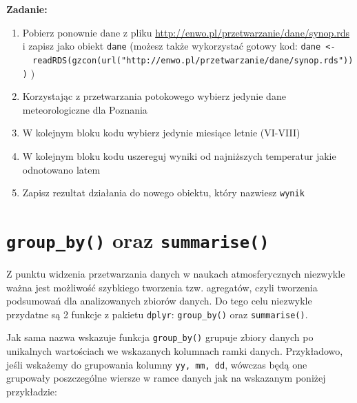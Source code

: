 \documentclass[]{book}
\providecommand{\tightlist}{%
  \setlength{\itemsep}{0pt}\setlength{\parskip}{0pt}}
\theoremstyle{definition}
\theoremstyle{definition}
\theoremstyle{definition}
\theoremstyle{remark}
\begin{document}
\textbf{Zadanie:}

\begin{enumerate}
\def\labelenumi{\arabic{enumi}.}
\tightlist
\item
  Pobierz ponownie dane z pliku
  \url{http://enwo.pl/przetwarzanie/dane/synop.rds} i zapisz jako obiekt
  \texttt{dane} (możesz także wykorzystać gotowy kod:
  \texttt{dane\ \textless{}-\ \ readRDS(gzcon(url("http://enwo.pl/przetwarzanie/dane/synop.rds")))}
  )
\item
  Korzystając z przetwarzania potokowego wybierz jedynie dane
  meteorologiczne dla Poznania
\item
  W kolejnym bloku kodu wybierz jedynie miesiące letnie (VI-VIII)
\item
  W kolejnym bloku kodu uszereguj wyniki od najniższych temperatur jakie
  odnotowano latem
\item
  Zapisz rezultat działania do nowego obiektu, który nazwiesz
  \texttt{wynik}
\end{enumerate}

\section{\texorpdfstring{\texttt{group\_by()} oraz
\texttt{summarise()}}{group\_by() oraz summarise()}}\label{group_by-oraz-summarise}

Z punktu widzenia przetwarzania danych w naukach atmosferycznych
niezwykle ważna jest możliwość szybkiego tworzenia tzw. agregatów, czyli
tworzenia podsumowań dla analizowanych zbiorów danych. Do tego celu
niezwykle przydatne są 2 funkcje z pakietu \texttt{dplyr}:
\texttt{group\_by()} oraz \texttt{summarise()}.

Jak sama nazwa wskazuje funkcja \texttt{group\_by()} grupuje zbiory
danych po unikalnych wartościach we wskazanych kolumnach ramki danych.
Przykładowo, jeśli wskażemy do grupowania kolumny \texttt{yy,\ mm,\ dd},
wówczas będą one grupowały poszczególne wiersze w ramce danych jak na
wskazanym poniżej przykładzie:
\end{document}
